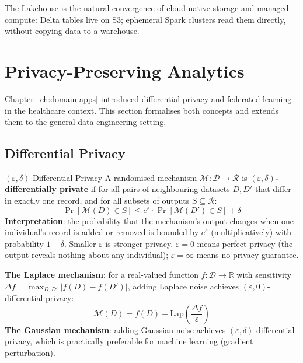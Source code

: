 The Lakehouse is the natural convergence of cloud-native storage and
managed compute: Delta tables live on S3; ephemeral Spark clusters read
them directly, without copying data to a warehouse.

\section{Privacy-Preserving Analytics}
\label{sec:privacy}

Chapter~\ref{ch:domain-apps} introduced differential privacy and federated
learning in the healthcare context. This section formalises both concepts
and extends them to the general data engineering setting.

\subsection{Differential Privacy}
\label{subsec:dp}

\begin{defbox}{$(\varepsilon, \delta)$-Differential Privacy}
A randomised mechanism $\mathcal{M}: \mathcal{D} \to \mathcal{R}$ is
\textbf{$(\varepsilon, \delta)$-differentially private} if for all pairs
of neighbouring datasets $D, D'$ that differ in exactly one record, and
for all subsets of outputs $S \subseteq \mathcal{R}$:
\[
  \Pr[\mathcal{M}(D) \in S]
  \leq e^\varepsilon \cdot \Pr[\mathcal{M}(D') \in S] + \delta
\]
\textbf{Interpretation}: the probability that the mechanism's output
changes when one individual's record is added or removed is bounded by
$e^\varepsilon$ (multiplicatively) with probability $1 - \delta$.
Smaller $\varepsilon$ is stronger privacy. $\varepsilon = 0$ means
perfect privacy (the output reveals nothing about any individual);
$\varepsilon = \infty$ means no privacy guarantee.

\textbf{The Laplace mechanism}: for a real-valued function $f: \mathcal{D}
\to \mathbb{R}$ with sensitivity $\Delta f = \max_{D, D'} |f(D) - f(D')|$,
adding Laplace noise achieves $(\varepsilon, 0)$-differential privacy:
\[
  \mathcal{M}(D) = f(D) + \text{Lap}\!\left(\frac{\Delta f}{\varepsilon}\right)
\]
\textbf{The Gaussian mechanism}: adding Gaussian noise achieves
$(\varepsilon, \delta)$-differential privacy, which is practically
preferable for machine learning (gradient perturbation).
\end{defbox}

